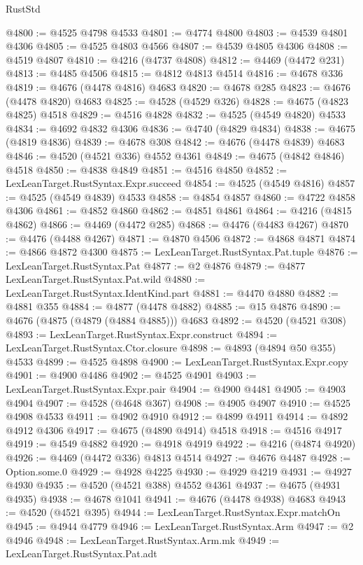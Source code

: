 \begin{lexlean}{RustStd}
\begin{coremodule}
@4800 := @4525 @4798 @4533
@4801 := @4774 @4800
@4803 := @4539 @4801 @4306
@4805 := @4525 @4803 @4566
@4807 := @4539 @4805 @4306
@4808 := @4519 @4807
@4810 := @4216 (@4737 @4808)
@4812 := @4469 (@4472 @231)
@4813 := @4485 @4506
@4815 := @4812 @4813 @4514
@4816 := @4678 @336
@4819 := @4676 (@4478 @4816) @4683
@4820 := @4678 @285
@4823 := @4676 (@4478 @4820) @4683
@4825 := @4528 (@4529 @326)
@4828 := @4675 (@4823 @4825) @4518
@4829 := @4516 @4828
@4832 := @4525 (@4549 @4820) @4533
@4834 := @4692 @4832 @4306
@4836 := @4740 (@4829 @4834)
@4838 := @4675 (@4819 @4836)
@4839 := @4678 @308
@4842 := @4676 (@4478 @4839) @4683
@4846 := @4520 (@4521 @336) @4552 @4361
@4849 := @4675 (@4842 @4846) @4518
@4850 := @4838 @4849
@4851 := @4516 @4850
@4852 := LexLeanTarget.RustSyntax.Expr.succeed
@4854 := @4525 (@4549 @4816)
@4857 := @4525 (@4549 @4839) @4533
@4858 := @4854 @4857
@4860 := @4722 @4858 @4306
@4861 := @4852 @4860
@4862 := @4851 @4861
@4864 := @4216 (@4815 @4862)
@4866 := @4469 (@4472 @285)
@4868 := @4476 (@4483 @4267)
@4870 := @4476 (@4488 @4267)
@4871 := @4870 @4506
@4872 := @4868 @4871
@4874 := @4866 @4872 @4300
@4875 := LexLeanTarget.RustSyntax.Pat.tuple
@4876 := LexLeanTarget.RustSyntax.Pat
@4877 := @2 @4876
@4879 := @4877 LexLeanTarget.RustSyntax.Pat.wild
@4880 := LexLeanTarget.RustSyntax.IdentKind.part
@4881 := @4470 @4880
@4882 := @4881 @355
@4884 := @4877 (@4478 @4882)
@4885 := @15 @4876
@4890 := @4676 (@4875 (@4879 (@4884 @4885))) @4683
@4892 := @4520 (@4521 @308)
@4893 := LexLeanTarget.RustSyntax.Expr.construct
@4894 := LexLeanTarget.RustSyntax.Ctor.closure
@4898 := @4893 (@4894 @50 @355) @4533
@4899 := @4525 @4898
@4900 := LexLeanTarget.RustSyntax.Expr.copy
@4901 := @4900 @4486
@4902 := @4525 @4901
@4903 := LexLeanTarget.RustSyntax.Expr.pair
@4904 := @4900 @4481
@4905 := @4903 @4904
@4907 := @4528 (@4648 @367)
@4908 := @4905 @4907
@4910 := @4525 @4908 @4533
@4911 := @4902 @4910
@4912 := @4899 @4911
@4914 := @4892 @4912 @4306
@4917 := @4675 (@4890 @4914) @4518
@4918 := @4516 @4917
@4919 := @4549 @4882
@4920 := @4918 @4919
@4922 := @4216 (@4874 @4920)
@4926 := @4469 (@4472 @336) @4813 @4514
@4927 := @4676 @4487
@4928 := Option.some.{0}
@4929 := @4928 @4225
@4930 := @4929 @4219
@4931 := @4927 @4930
@4935 := @4520 (@4521 @388) @4552 @4361
@4937 := @4675 (@4931 @4935)
@4938 := @4678 @1041
@4941 := @4676 (@4478 @4938) @4683
@4943 := @4520 (@4521 @395)
@4944 := LexLeanTarget.RustSyntax.Expr.matchOn
@4945 := @4944 @4779
@4946 := LexLeanTarget.RustSyntax.Arm
@4947 := @2 @4946
@4948 := LexLeanTarget.RustSyntax.Arm.mk
@4949 := LexLeanTarget.RustSyntax.Pat.adt

\end{coremodule}
\end{lexlean}
